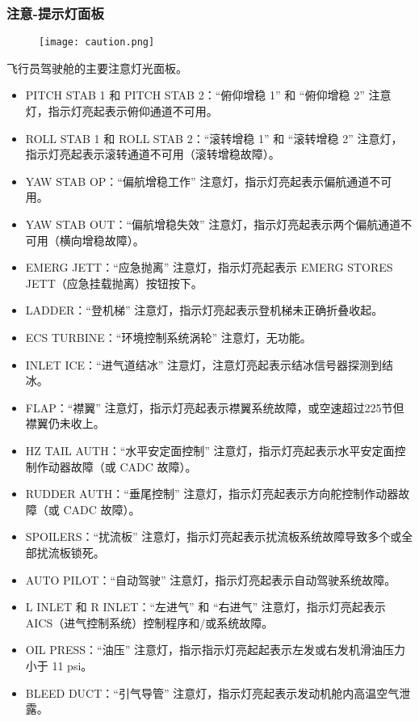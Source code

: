 \subsubsection{注意-提示灯面板}

\begin{figure}[htb]
  \center
  \texttt{[image: caution.png]}
\end{figure}
飞行员驾驶舱的主要注意灯光面板。

\begin{itemize}
  \item PITCH STAB 1 和 PITCH STAB 2：“俯仰增稳 1” 和 “俯仰增稳 2” 注意灯，指示灯亮起表示俯仰通道不可用。
  \item ROLL STAB 1 和 ROLL STAB 2：“滚转增稳 1” 和 “滚转增稳 2” 注意灯，指示灯亮起表示滚转通道不可用（滚转增稳故障）。
  \item YAW STAB OP：“偏航增稳工作” 注意灯，指示灯亮起表示偏航通道不可用。
  \item YAW STAB OUT：“偏航增稳失效” 注意灯，指示灯亮起表示两个偏航通道不可用（横向增稳故障）。
  \item EMERG JETT：“应急抛离” 注意灯，指示灯亮起表示 EMERG STORES JETT（应急挂载抛离）按钮按下。
  \item LADDER：“登机梯” 注意灯，指示灯亮起表示登机梯未正确折叠收起。
  \item ECS TURBINE：“环境控制系统涡轮” 注意灯，无功能。
  \item INLET ICE：“进气道结冰” 注意灯，注意灯亮起表示结冰信号器探测到结冰。
  \item FLAP：“襟翼” 注意灯，指示灯亮起表示襟翼系统故障，或空速超过225节但襟翼仍未收上。
  \item HZ TAIL AUTH：“水平安定面控制” 注意灯，指示灯亮起表示水平安定面控制作动器故障（或 CADC 故障）。
  \item RUDDER AUTH：“垂尾控制” 注意灯，指示灯亮起表示方向舵控制作动器故障（或 CADC 故障）。
  \item SPOILERS：“扰流板” 注意灯，指示灯亮起表示扰流板系统故障导致多个或全部扰流板锁死。
  \item AUTO PILOT：“自动驾驶” 注意灯，指示灯亮起表示自动驾驶系统故障。
  \item L INLET 和 R INLET：“左进气” 和 “右进气” 注意灯，指示灯亮起表示 AICS（进气控制系统）控制程序和/或系统故障。
  \item OIL PRESS：“油压” 注意灯，指示指示灯亮起起表示左发或右发机滑油压力小于 11 psi。
  \item BLEED DUCT：“引气导管” 注意灯，指示灯亮起表示发动机舱内高温空气泄露。

\end{itemize}
